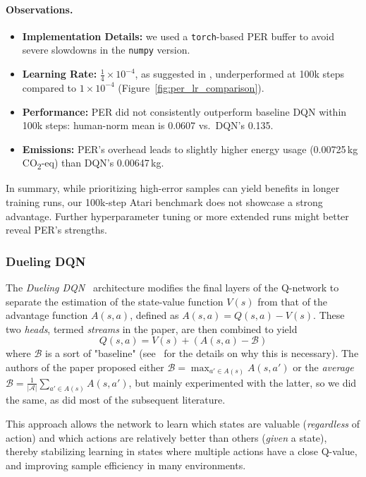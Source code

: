 \paragraph{Observations.}
\begin{itemize}
	\item \textbf{Implementation Details:} 
	we used a \texttt{torch}-based PER buffer to avoid severe slowdowns in the \texttt{numpy} version.
	\item \textbf{Learning Rate:} 
	$\tfrac{1}{4}\times10^{-4}$, as suggested in \cite{schaul:prioritized}, underperformed at 100k steps 
	compared to $1\times10^{-4}$ (Figure~\vref{fig:per_lr_comparison}).
	\item \textbf{Performance:} 
	PER did not consistently outperform baseline DQN within 100k steps: 
	human-norm mean is 0.0607 vs.\ DQN’s 0.135. 
	\item \textbf{Emissions:} 
	PER's overhead leads to slightly higher energy usage (0.00725\,kg CO\textsubscript{2}-eq) than DQN’s 0.00647\,kg.
\end{itemize}

In summary, while prioritizing high-error samples can yield benefits in longer training runs, 
our 100k-step Atari benchmark does not showcase a strong advantage. 
Further hyperparameter tuning or more extended runs might better reveal PER’s strengths.


\subsubsection{Dueling DQN}
\label{subsubsec:dueling_dqn}
The \emph{Dueling DQN}~\cite{wang:dueling} architecture modifies the final layers of the Q-network
to separate the estimation of the state-value function $V(s)$ from that of the advantage function $A(s,a)$,
defined as $A(s, a) = Q(s, a) - V(s)$.
These two \textit{heads}, termed \textit{streams} in the paper, are then combined to yield
$$
Q(s, a) = V(s) + (A(s, a) - \mathcal{B})
$$
where $\mathcal{B}$ is a sort of "baseline" (see~\cite{wang:dueling} for the details on why this is necessary). The authors of the paper proposed either $\mathcal{B} = \max_{a' \in A(s)} A(s, a')$ or the \textit{average} $\mathcal{B} = \frac{1}{|\mathcal{A}|}\sum_{a' \in A(s)} A(s, a')$, but mainly experimented with the latter, so we did the same, as did most of the subsequent literature.

This approach allows the network to learn which states are valuable 
(\emph{regardless} of action) and which actions are relatively better than others 
(\emph{given} a state), thereby stabilizing learning in states where multiple actions have a close Q-value, and improving sample efficiency 
in many environments.

